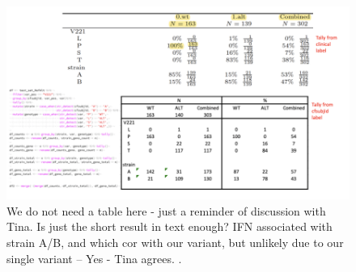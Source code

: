 \documentclass{article}
\begin{document}
	\begin{figure}[ht] \hspace*{0cm}
    \includegraphics[scale=0.5]{fx}
	\caption{We do not need a table here - just a reminder of discussion with Tina.
	Is just the short result in text enough? IFN associated with strain A/B, and which cor with our variant, but unlikely due to our single variant 
	-- Yes - Tina agrees. .}
	\label{fig:5} \end{figure}
	
\end{document}
